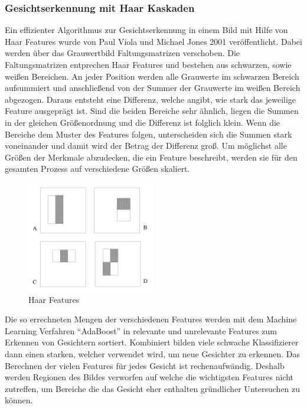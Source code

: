 \documentclass[12pt, a4paper]{article}
\begin{document}
\subsubsection{Gesichtserkennung mit Haar Kaskaden}
\label{sec:haar}
Ein effizienter Algorithmus zur Gesichtserkennung in einem Bild mit Hilfe von Haar Features wurde von Paul Viola und Michael Jones 2001 veröffentlicht.\cite{violajones:paper} Dabei werden über das Grauwertbild Faltungsmatrizen verschoben. Die Faltungsmatrizen entprechen Haar Features und bestehen aus schwarzen, sowie weißen Bereichen. An jeder Position werden alle Grauwerte im schwarzen Bereich aufsummiert und anschließend von der Summer der Grauwerte im weißen Bereich abgezogen. Daraus entsteht eine Differenz, welche angibt, wie stark das jeweilige Feature ausgeprägt ist. Sind die beiden Bereiche sehr ähnlich, liegen die Summen in der gleichen Größenordnung und die Differenz ist folglich klein. Wenn die Bereiche dem Muster des Features folgen, unterscheiden sich die Summen stark voneinander und damit wird der Betrag der Differenz groß. Um möglichst alle Größen der Merkmale abzudecken, die ein Feature beschreibt, werden sie für den gesamten Prozess auf verschiedene Größen skaliert.

\begin{figure}
	\centering
	\includegraphics[width=0.5\textwidth]{haar_features}
	\caption{Haar Features\cite{violajones:paper}}
\end{figure}

Die so errechneten Mengen der verschiedenen Features werden mit dem Machine Learning Verfahren \enquote{AdaBoost} in relevante und unrelevante Features zum Erkennen von Gesichtern sortiert. Kombiniert bilden viele schwache Klassifizierer dann einen starken, welcher verwendet wird, um neue Gesichter zu erkennen. Das Berechnen der vielen Features für jedes Gesicht ist rechenaufwändig. Deshalb werden Regionen des Bildes verworfen auf welche die wichtigsten Features nicht zutreffen, um Bereiche die das Gesicht eher enthalten gründlicher Untersuchen zu können.
\end{document}
